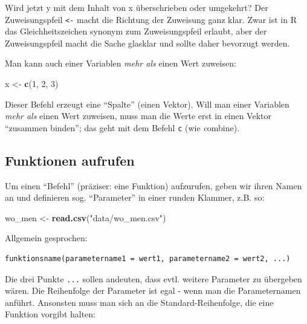 \documentclass[12pt,ngerman,]{book}
\newenvironment{Shaded}{\begin{snugshade}}{\end{snugshade}}
\newcommand{\KeywordTok}[1]{\textcolor[rgb]{0.13,0.29,0.53}{\textbf{{#1}}}}
\newcommand{\DecValTok}[1]{\textcolor[rgb]{0.00,0.00,0.81}{{#1}}}
\newcommand{\StringTok}[1]{\textcolor[rgb]{0.31,0.60,0.02}{{#1}}}
\newcommand{\NormalTok}[1]{{#1}}
\renewenvironment{Shaded}{\begin{kframe}}{\end{kframe}}
\begin{document}
Wird jetzt y mit dem Inhalt von x überschrieben oder umgekehrt? Der
Zuweisungspfeil \texttt{\textless{}-} macht die Richtung der Zuweisung
ganz klar. Zwar ist in R das Gleichheitszeichen synonym zum
Zuweisungspfeil erlaubt, aber der Zuweisungspfeil macht die Sache
glasklar und sollte daher bevorzugt werden.

Man kann auch einer Variablen \emph{mehr als} einen Wert zuweisen:

\begin{Shaded}
\begin{Highlighting}[]
\NormalTok{x <-}\StringTok{ }\KeywordTok{c}\NormalTok{(}\DecValTok{1}\NormalTok{, }\DecValTok{2}\NormalTok{, }\DecValTok{3}\NormalTok{)}
\end{Highlighting}
\end{Shaded}

Dieser Befehl erzeugt eine ``Spalte'' (einen Vektor). Will man einer
Variablen \emph{mehr als} einen Wert zuweisen, muss man die Werte erst
in einen Vektor ``zusammen binden''; das geht mit dem Befehl \texttt{c}
(wie \emph{c}ombine).

\subsection{Funktionen aufrufen}\label{funktionen-aufrufen}

Um einen ``Befehl'' (präziser: eine Funktion) aufzurufen, geben wir
ihren Namen an und definieren sog. ``Parameter'' in einer runden
Klammer, z.B. so:

\begin{Shaded}
\begin{Highlighting}[]
\NormalTok{wo_men <-}\StringTok{ }\KeywordTok{read.csv}\NormalTok{(}\StringTok{"data/wo_men.csv"}\NormalTok{)}
\end{Highlighting}
\end{Shaded}

Allgemein gesprochen:

\begin{verbatim}
funktionsname(parametername1 = wert1, parametername2 = wert2, ...)
\end{verbatim}

Die drei Punkte \texttt{...} sollen andeuten, dass evtl. weitere
Parameter zu übergeben wären. Die Reihenfolge der Parameter ist egal -
wenn man die Parameternamen anführt. Ansonsten muss man sich an die
Standard-Reihenfolge, die eine Funktion vorgibt halten:
\end{document}
